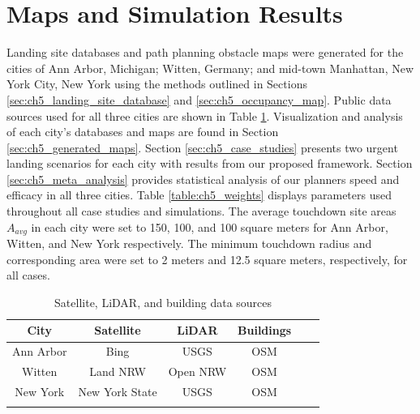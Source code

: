 \section{Maps and Simulation Results}\label{sec:ch5_experiments}

Landing site databases and path planning obstacle maps were generated for the cities of Ann Arbor, Michigan; Witten, Germany; and mid-town Manhattan, New York City, New York using the methods outlined in Sections \ref{sec:ch5_landing_site_database} and \ref{sec:ch5_occupancy_map}. Public data sources used for all three cities are shown in Table \ref{table:ch5_data_sources}. Visualization and analysis of each city's databases and maps are found in Section \ref{sec:ch5_generated_maps}. Section \ref{sec:ch5_case_studies} presents two urgent landing scenarios for each city with results from our proposed framework. Section \ref{sec:ch5_meta_analysis} provides statistical analysis of our planners speed and efficacy in all three cities. Table \ref{table:ch5_weights} displays parameters used throughout all case studies and simulations. The average touchdown site areas $A_{avg}$ in each city were set to 150, 100, and 100 square meters for Ann Arbor, Witten, and New York respectively. The minimum touchdown radius and corresponding area were set to 2 meters and 12.5 square meters, respectively, for all cases.

\begin{table}[ht]
\centering
\caption{Satellite, LiDAR, and building data sources}\label{table:ch5_data_sources}
\begin{tabular}{c@{\qquad}cc@{\qquad}cc@{\qquad}c}
  \hline\noalign{\smallskip}
  City & Satellite & LiDAR & Buildings \\
  \hline\noalign{\smallskip}
  Ann Arbor & Bing \cite{satellite_annarbor}            & USGS \cite{usgs_lidar_2018-annarbor}       & \ac{OSM}\cite{openstreetmap_contributors_planet_2017}  \\
  Witten    & Land NRW \cite{satellite_germany}         & Open NRW \cite{lidar_germany}    & \ac{OSM}\cite{openstreetmap_contributors_planet_2017}  \\
  New York  & New York State \cite{satellite_newyork}   & USGS \cite{usgs_lidar_2018_ny}        & \ac{OSM}\cite{openstreetmap_contributors_planet_2017}  \\
\noalign{\smallskip}\hline\noalign{\smallskip}
\end{tabular}
\end{table}


